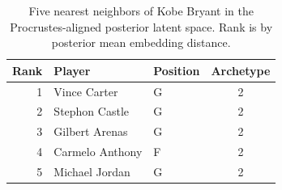 \begin{table}[htbp]
  \centering\small
  \begin{tabular}{rllc}
    \toprule
    Rank & Player & Position & Archetype \\
    \midrule
    1 & Vince Carter & G & 2 \\
    2 & Stephon Castle & G & 2 \\
    3 & Gilbert Arenas & G & 2 \\
    4 & Carmelo Anthony & F & 2 \\
    5 & Michael Jordan & G & 2 \\
    \bottomrule
  \end{tabular}
  \caption{Five nearest neighbors of Kobe Bryant in the Procrustes-aligned posterior latent space. Rank is by posterior mean embedding distance.}
  \label{tab:Kobe_Bryant_neighbors}
\end{table}

